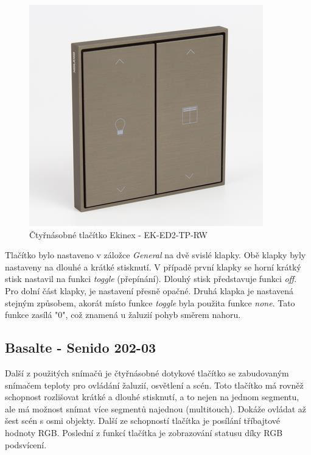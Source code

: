 \begin{figure}[!ht]
  \begin{center}
    \includegraphics[scale=0.6]{obrazky/Ekinex.png}
  \end{center}
  \caption[Čtyřnásobné tlačítko Ekinex - EK-ED2-TP-RW \cite{Mitrenga}]{Čtyřnásobné tlačítko Ekinex - EK-ED2-TP-RW \cite{Mitrenga}}
  \label{fig:Čtyřnásobné tlačítko se zabudovaným teplotním senzorem Ekinex - EK-ED2-TP-RW}
\end{figure}

Tlačítko bylo nastaveno v záložce \textit{General} na dvě svislé klapky. Obě klapky byly nastaveny na dlouhé a krátké stisknutí. V případě první klapky se horní krátký stisk nastavil na funkci \textit{toggle} (přepínání). Dlouhý stisk představuje funkci \textit{off}. Pro dolní část klapky, je nastavení přesně opačné. Druhá klapka je nastavená stejným způsobem, akorát místo funkce \textit{toggle} byla použita funkce \textit{none}. Tato funkce zasílá "0", což znamená u žaluzií pohyb směrem nahoru.

\subsection{Basalte - Senido 202-03}
Další z použitých snímačů je čtyřnásobné dotykové tlačítko se zabudovaným snímačem teploty pro ovládání žaluzií, osvětlení a scén. Toto tlačítko má rovněž schopnost rozlišovat krátké a dlouhé stisknutí, a to nejen na jednom segmentu, ale má možnost snímat více segmentů najednou (multitouch). Dokáže ovládat až šest scén s osmi objekty. Další ze schopností tlačítka je posílání tříbajtové hodnoty RGB. Poslední z funkcí tlačítka je zobrazování statusu díky RGB podsvícení. \cite{Basalte}


